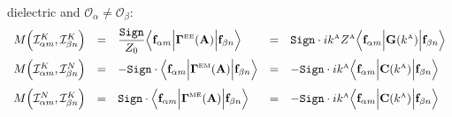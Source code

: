 \documentclass[letterpaper]{article}
\begin{document}
\begin{enumerate}
{               dielectric and $\mathcal{O}_\alpha \ne \mathcal{O}_\beta$:}
$$\begin{array}{lclcl}
 M\Big( \mathcal{I}^K_{\alpha m}, \mathcal{I}^K_{\beta n} \Big) 
  &=& 
  \displaystyle{ \frac{\texttt{Sign}}{Z_0} 
                 \Big\langle \vb f_{\alpha m} 
                 \Big| \BG\supt{EE}(\vb A) \Big|
                 \vb f_{\beta n} 
                 \Big\rangle
               }
  &=&
  \displaystyle{ \texttt{Sign}\cdot ik\supt{A} Z\supt{A}
                 \Big\langle \vb f_{\alpha m} 
                 \Big| \vb G(k\supt{A}) \Big|
                 \vb f_{\beta n} 
                 \Big\rangle
               }
\\[10pt]
 M\Big( \mathcal{I}^K_{\alpha m}, \mathcal{I}^N_{\beta n} \Big) 
  &=&
  \displaystyle{ -\texttt{Sign}\cdot
                 \Big\langle 
                 \vb f_{\alpha m} 
                 \Big|\BG\supt{EM}(\vb A) \Big|
                 \vb f_{\beta n} 
                 \Big\rangle
               }
  &=&
  \displaystyle{ -\texttt{Sign}\cdot ik\supt{A}
                  \Big\langle 
                  \vb f_{\alpha m} 
                  \Big| \vb C(k\supt{A})\Big|
                  \vb f_{\beta n} 
                  \Big\rangle
               }
\\[10pt]
 M\Big( \mathcal{I}^N_{\alpha m}, \mathcal{I}^K_{\beta n} \Big) 
  &=&
  \displaystyle{ \texttt{Sign}\cdot
                 \Big\langle 
                 \vb f_{\alpha m} 
                 \Big|\BG\supt{ME}(\vb A) \Big|
                 \vb f_{\beta n} 
                 \Big\rangle
               }
  &=&
  \displaystyle{ -\texttt{Sign}\cdot ik\supt{A}
                  \Big\langle 
                  \vb f_{\alpha m} 
                  \Big| \vb C(k\supt{A})\Big|
                  \vb f_{\beta n} 
                  \Big\rangle
               }
\\[10pt]

\end{array}$$
\end{enumerate}
\end{document}
